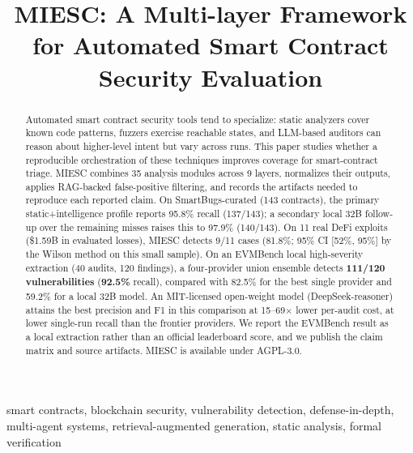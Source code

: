 \documentclass[conference]{IEEEtran}
\begin{document}
\title{MIESC: A Multi-layer Framework for Automated Smart Contract Security Evaluation}

\author{
}

\maketitle

\begin{abstract}
Automated smart contract security tools tend to specialize: static analyzers cover known code patterns, fuzzers exercise reachable states, and LLM-based auditors can reason about higher-level intent but vary across runs. This paper studies whether a reproducible orchestration of these techniques improves coverage for smart-contract triage. MIESC combines 35 analysis modules across 9 layers, normalizes their outputs, applies RAG-backed false-positive filtering, and records the artifacts needed to reproduce each reported claim. On SmartBugs-curated (143 contracts), the primary static+intelligence profile reports 95.8\% recall (137/143); a secondary local 32B follow-up over the remaining misses raises this to 97.9\% (140/143). On 11 real DeFi exploits (\$1.59B in evaluated losses), MIESC detects 9/11 cases (81.8\%; 95\% CI [52\%, 95\%] by the Wilson method on this small sample). On an EVMBench local high-severity extraction (40 audits, 120 findings), a four-provider union ensemble detects \textbf{111/120 vulnerabilities} (\textbf{92.5\%} recall), compared with 82.5\% for the best single provider and 59.2\% for a local 32B model. An MIT-licensed open-weight model (DeepSeek-reasoner) attains the best precision and F1 in this comparison at 15--69$\times$ lower per-audit cost, at lower single-run recall than the frontier providers. We report the EVMBench result as a local extraction rather than an official leaderboard score, and we publish the claim matrix and source artifacts. MIESC is available under AGPL-3.0.
\end{abstract}

\begin{IEEEkeywords}
smart contracts, blockchain security, vulnerability detection, defense-in-depth, multi-agent systems, retrieval-augmented generation, static analysis, formal verification
\end{IEEEkeywords}
\end{document}

